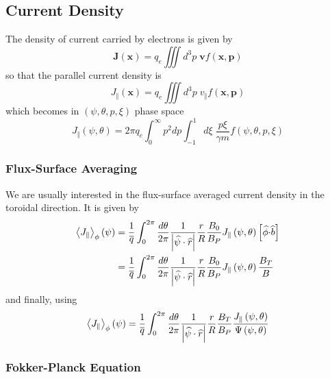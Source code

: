 \documentclass[12pt,a4paper]{article}
\begin{document}
\subsection{Current Density}

The density of current carried by electrons is given by 
\begin{equation}
\mathbf{J}\left( \mathbf{x}\right) =q_{e}\iiint d^{3}p\;\mathbf{v}f\left( 
\mathbf{x},\mathbf{p}\right)
\end{equation}
so that the parallel current density is 
\begin{equation}
J_{\Vert}\left( \mathbf{x}\right) =q_{e}\iiint d^{3}p\;v_{\Vert}f\left( 
\mathbf{x},\mathbf{p}\right)
\end{equation}
which becomes in $\left( \psi,\theta,p,\xi\right) $ phase space 
\begin{equation}
J_{\Vert}\left( \psi,\theta\right) =2\pi
q_{e}\int_{0}^{\infty}p^{2}dp\int_{-1}^{1}d\xi\;\frac{p\xi}{\gamma m}f\left(
\psi,\theta,p,\xi\right)
\end{equation}

\subsubsection{Flux-Surface Averaging}

We are usually interested in the flux-surface averaged current density in
the toroidal direction. It is given by  
\begin{align}
\left\langle J_{\Vert}\right\rangle _{\phi}\left( \psi\right) & =\frac {1}{%
\overline{q}}\int_{0}^{2\pi}\frac{d\theta}{2\pi}\frac{1}{\left| \widehat{\psi%
}\cdot\widehat{r}\right| }\frac{r}{R}\frac{B_{0}}{B_{P}}J_{\Vert}\left(
\psi,\theta\right) \left[ \widehat{\phi}\mathbf{\cdot }\widehat{b}\right] 
\nonumber \\
& =\frac{1}{\overline{q}}\int_{0}^{2\pi}\frac{d\theta}{2\pi}\frac{1}{\left| 
\widehat{\psi}\cdot\widehat{r}\right| }\frac{r}{R}\frac{B_{0}}{B_{P}}
J_{\Vert}\left( \psi,\theta\right) \frac{B_{T}}{B}
\end{align}
and finally, using
\begin{equation}
\left\langle J_{\Vert}\right\rangle _{\phi}\left( \psi\right) =\frac {1}{%
\overline{q}}\int_{0}^{2\pi}\frac{d\theta}{2\pi}\frac{1}{\left| \widehat{\psi%
}\cdot\widehat{r}\right| }\frac{r}{R}\frac{B_{T}}{B_{P}}\frac{
J_{\Vert}\left( \psi,\theta\right) }{\Psi\left( \psi,\theta\right) }
\end{equation}

\subsubsection{Fokker-Planck Equation}
\end{document}
